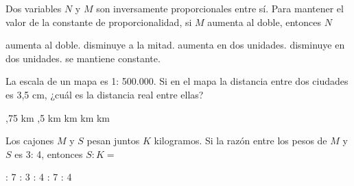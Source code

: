 \documentclass[pagina vacia]{srs}
\begin{document}
\begin{preguntas}
\pregunta Dos variables $N$ y $M$ son inversamente proporcionales entre sí.
Para mantener el valor de la constante de proporcionalidad, si $M$ aumenta al
doble, entonces $N$
\begin{vertical}
\alternativa aumenta al doble.
\alternativa disminuye a la mitad.
\alternativa aumenta en dos unidades.
\alternativa disminuye en dos unidades.
\alternativa se mantiene constante.
\end{vertical}
%
%
\pregunta La escala de un mapa es 1: 500.000. Si en el mapa la distancia entre dos ciudades
 es 3,5 cm, ¿cuál es la distancia real entre ellas?
\begin{vertical}
,75 km
,5 km
 km
 km
 km
\end{vertical}

\pregunta Los cajones $M$ y $S$ pesan juntos $K$ kilogramos. Si la razón entre los pesos
de $M$ y $S$ es 3: 4, entonces $S: K=$
\begin{vertical}
: 7
: 3
: 4
: 7
: 4
\end{vertical}


\end{preguntas}
\end{document}
